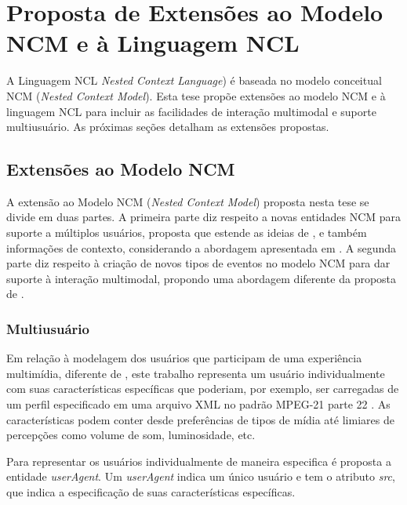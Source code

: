 \chapter{Proposta de Extensões ao Modelo NCM e à Linguagem NCL} \label{cap:cap4}

A Linguagem NCL \textit{Nested Context Language}) é baseada no modelo conceitual NCM (\textit{Nested Context Model}). Esta tese propõe extensões ao modelo NCM e à linguagem NCL para incluir as facilidades de interação multimodal e suporte multiusuário. As próximas seções detalham as extensões propostas.

\section{Extensões ao Modelo NCM}
\label{sec:NCMExt}

A extensão ao Modelo NCM (\textit{Nested Context Model}) proposta nesta tese se divide em duas partes. A primeira parte diz respeito a novas entidades NCM para suporte a múltiplos usuários, proposta que estende as ideias de \cite{guedes2016extending}, e também informações de contexto, considerando a abordagem apresentada em \cite{Josue:2018:MSE:3204949.3204967}. A segunda  parte diz respeito à criação de novos tipos de eventos no modelo NCM para dar suporte à interação multimodal, propondo uma abordagem diferente da proposta de \cite{guedes2016extending}. 

\subsection{Multiusuário}
\label{sec:MultUser}

Em relação à modelagem dos usuários que participam de uma experiência multimídia, diferente de \cite{guedes2016extending}, este trabalho representa um usuário individualmente com suas características específicas que poderiam, por exemplo, ser carregadas de um perfil especificado em uma arquivo XML no padrão MPEG-21 parte 22 \cite{ISO/IEC:2019aa}. As características podem conter desde preferências de tipos de mídia até limiares de percepções como volume de som, luminosidade, etc. 

Para representar os usuários individualmente de maneira especifica é proposta a entidade  \textit{userAgent}. Um \textit{userAgent} indica um único usuário e tem o atributo \textit{src}, que indica a especificação de suas características específicas. 


